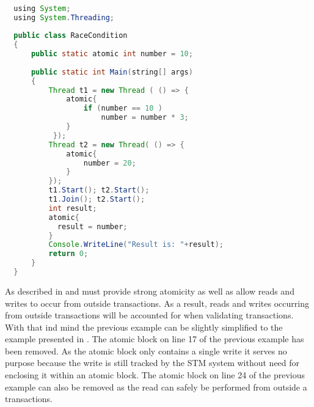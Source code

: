 \begin{lstlisting}[label=lst:stm_atomic_syntax,
  caption={Transaction Syntax},
  language=Java,  
  showspaces=false,
  showtabs=false,
  breaklines=true,
  showstringspaces=false,
  breakatwhitespace=true,
  commentstyle=\color{greencomments},
  keywordstyle=\color{bluekeywords},
  stringstyle=\color{redstrings},
  morekeywords={atomic, retry, orElse, var, get, set, using}]  % Start your code-block

  using System;
  using System.Threading;
  
  public class RaceCondition
  {
      public static atomic int number = 10;
  
      public static int Main(string[] args)
      {
          Thread t1 = new Thread ( () => {
              atomic{
                  if (number == 10 )           
                      number = number * 3;
              }
           });
          Thread t2 = new Thread( () => {
              atomic{
                  number = 20;
              }
          });
          t1.Start(); t2.Start();
          t1.Join(); t2.Start();
          int result;
          atomic{
          	result = number;          
          }
          Console.WriteLine("Result is: "+result);
          return 0;
      }
  }
\end{lstlisting}

As described in  and  \stmnamesp must provide strong atomicity as well as allow reads and writes to occur from outside transactions. As a result, reads and writes occurring from outside transactions will be accounted for when validating transactions. With that ind mind the previous example can be slightly simplified to the example presented in . The atomic block on line 17 of the previous example has been removed. As the atomic block only contains a single write it serves no purpose because the write is still tracked by the \ac{STM} system without need for enclosing it within an atomic block. The atomic block on line 24 of the previous example can also be removed as the read can safely be performed from outside a transactions.

